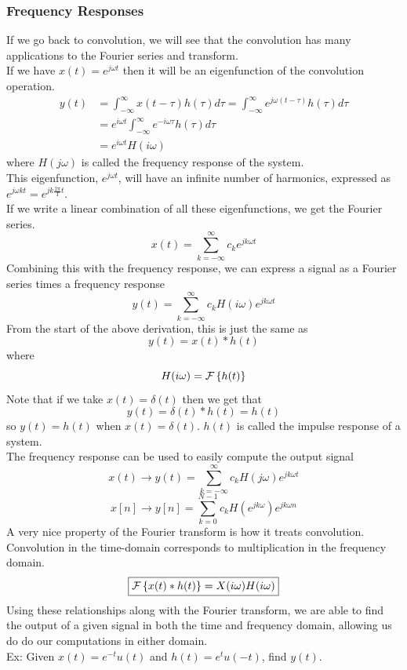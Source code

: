 \documentclass[11pt, fleqn]{article}
\begin{document}
\subsubsection{Frequency Responses}
If we go back to convolution, we will see that the convolution has many applications to the Fourier series and transform.\\
If we have $x(t)=e^{j\omega t}$ then it will be an eigenfunction of the convolution operation.
\begin{align*}
    y(t)&=\int_{-\infty}^\infty x(t-\tau)h(\tau)d\tau=\int_{-\infty}^\infty e^{j\omega(t-\tau)}h(\tau)d\tau\\
    &=e^{i\omega t}\int_{-\infty}^\infty e^{-i\omega \tau}h(\tau)d\tau\\
    &=e^{i\omega t}H(i\omega)
\end{align*}
where $H(j\omega)$ is called the frequency response of the system.\\
This eigenfunction, $e^{j\omega t}$, will have an infinite number of harmonics, expressed as $e^{j\omega kt}=e^{jk\frac{2\pi}{T}t}$.\\
If we write a linear combination of all these eigenfunctions, we get the Fourier series.
$$x(t)=\sum_{k=-\infty}^\infty c_ke^{jk\omega t}$$
Combining this with the frequency response, we can express a signal as a Fourier series times a frequency response
$$y(t)=\sum_{k=-\infty}^\infty c_kH(i\omega)e^{jk\omega t}$$
From the start of the above derivation, this is just the same as
$$y(t)=x(t)*h(t)$$
where
$$H(i\omega)=\mathcal{F}\left\{ h(t) \right\}$$
Note that if we take $x(t)=\delta(t)$ then we get that
$$y(t)=\delta(t)*h(t)=h(t)$$
so $y(t)=h(t)$ when $x(t)=\delta(t)$. $h(t)$ is called the impulse response of a system.\\
The frequency response can be used to easily compute the output signal
$$x(t)\to y(t)=\sum_{k=-\infty}^\infty c_kH(j\omega)e^{jk\omega t}$$
$$x[n]\to y[n]=\sum_{k=0}^{N-1}c_k H(e^{jk\omega})e^{jk\omega n}$$
A very nice property of the Fourier transform is how it treats convolution. Convolution in the time-domain corresponds to multiplication in the frequency domain.
$$\boxed{\mathcal{F}\left\{ x(t)*h(t) \right\}=X(i\omega)H(i\omega)}$$
Using these relationships along with the Fourier transform, we are able to find the output of a given signal in both the time and frequency domain, allowing us do do our computations in either domain.\\
Ex: Given $x(t)=e^{-t}u(t)$ and $h(t)=e^{t}u(-t)$, find $y(t)$.
\end{document}
